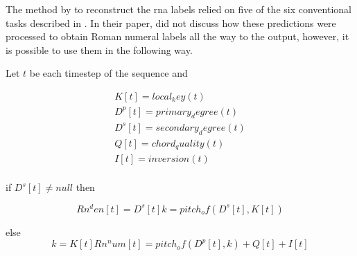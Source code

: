 
The method by \textcite{chen2018functional} to reconstruct
the \gls{rna} labels relied on five of the six conventional
tasks described in . In their
paper, \textcite{chen2018functional} did not discuss how
these predictions were processed to obtain Roman numeral
labels all the way to the output, however, it is possible to
use them in the following way.

Let $t$ be each timestep of the sequence and

\begin{equation}
\begin{split}
K[t] = local_key(t) \\
D^p[t] = primary_degre e(t) \\
D^s[t] = secondary_degree(t)  \\
Q[t] = chord_quality(t) \\
I[t] = inversion(t) \\
\end{split}
\end{equation}

if $D^s[t] \neq null$ then

\begin{equation}
Rn^den[t] = D^s[t]
k = pitch_of(D^s[t], K[t])
\end{equation}

else
\begin{equation}
k = K[t]
Rn^num[t] = pitch_of(D^p[t], k) + Q[t] + I[t] 
\end{equation}
